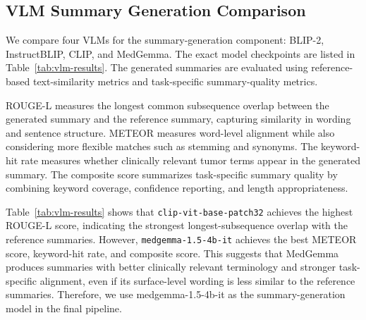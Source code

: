 \subsection{VLM Summary Generation Comparison}
We compare four VLMs for the summary-generation component: BLIP-2, InstructBLIP, CLIP, and MedGemma. The exact model checkpoints are listed in Table~\ref{tab:vlm-results}. The generated summaries are evaluated using reference-based text-similarity metrics and task-specific summary-quality metrics.

ROUGE-L measures the longest common subsequence overlap between the generated summary and the reference summary, capturing similarity in wording and sentence structure. METEOR measures word-level alignment while also considering more flexible matches such as stemming and synonyms. The keyword-hit rate measures whether clinically relevant tumor terms appear in the generated summary. The composite score summarizes task-specific summary quality by combining keyword coverage, confidence reporting, and length appropriateness.

\begin{table}[H]
    \centering
    \small
    \caption{VLM summary-generation comparison.}
    \label{tab:vlm-results}
    \setlength{\tabcolsep}{2pt}
    \end{table}

Table~\ref{tab:vlm-results} shows that \texttt{clip-vit-base-patch32} achieves the highest ROUGE-L score, indicating the strongest longest-subsequence overlap with the reference summaries. However, \texttt{medgemma-1.5-4b-it} achieves the best METEOR score, keyword-hit rate, and composite score. This suggests that MedGemma produces summaries with better clinically relevant terminology and stronger task-specific alignment, even if its surface-level wording is less similar to the reference summaries. Therefore, we use medgemma-1.5-4b-it as the summary-generation model in the final pipeline.





